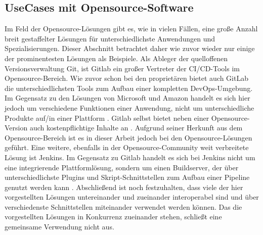 \subsection{UseCases mit Opensource-Software}
\label{UseCases mit Opensource-Software}
Im Feld der Opensource-Lösungen gibt es, wie in vielen Fällen, eine große Anzahl breit gestaffelter Lösungen für unterschiedlichste Anwendungen und Spezialisierungen. Dieser Abschnitt betrachtet daher wie zuvor wieder nur einige der prominentesten Lösungen als Beispiele.
Als Ableger der quelloffenen Versionsverwaltung Git, ist Gitlab ein großer Vertreter der \acrshort{CI}/\acrshort{CD}-Tools im Opensource-Bereich. Wie zuvor schon bei den proprietären bietet auch GitLab die unterschiedlichsten Tools zum Aufbau einer kompletten \gls{DevOps}-Umgebung. Im Gegensatz zu den Lösungen von Microsoft und Amazon handelt es sich hier jedoch um verschiedene Funktionen einer Anwendung, nicht um unterschiedliche Produkte auf/in einer Plattform \cite{gitlab_devops}. Gitlab selbst bietet neben einer Opensource-Version auch kostenpflichtige Inhalte an \cite{gitlab_pricing}. Aufgrund seiner Herkunft aus dem Opensource-Bereich ist es in dieser Arbeit jedoch bei den Opensource-Lösungen geführt.
Eine weitere, ebenfalls in der Opensource-Community weit verbreitete Lösung ist Jenkins. Im Gegensatz zu Gitlab handelt es sich bei Jenkins nicht um eine integrierende Plattformlösung, sondern um einen Buildserver, der über unterschiedlichste Plugins und Skript-Schnittstellen zum Aufbau einer Pipeline genutzt werden kann \cite{jenkins_about}.
Abschließend ist noch festzuhalten, dass viele der hier vorgestellten Lösungen untereinander und zueinander interoperabel sind und über verschiedenste Schnittstellen miteinander verwendet werden können. Das die vorgestellten Lösungen in Konkurrenz zueinander stehen, schließt eine gemeinsame Verwendung nicht aus.